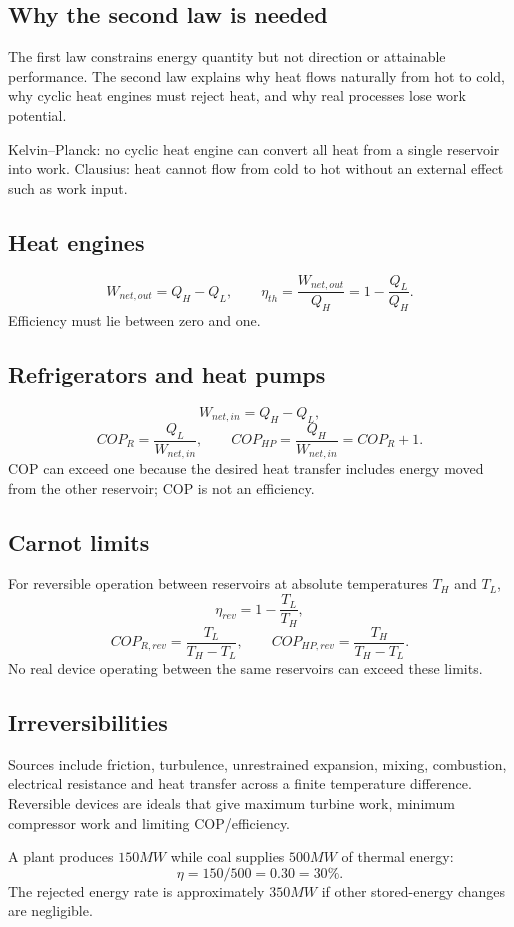 \documentclass[10pt,a4paper]{article}
\begin{document}
\subsection{Why the second law is needed}
The first law constrains energy quantity but not direction or attainable performance. The second law explains why heat flows naturally from hot to cold, why cyclic heat engines must reject heat, and why real processes lose work potential.

Kelvin--Planck: no cyclic heat engine can convert all heat from a single reservoir into work. Clausius: heat cannot flow from cold to hot without an external effect such as work input.

\subsection{Heat engines}
\[
W_{net,out}=Q_H-Q_L,
\qquad \eta_{th}=\frac{W_{net,out}}{Q_H}=1-\frac{Q_L}{Q_H}.
\]
Efficiency must lie between zero and one.

\subsection{Refrigerators and heat pumps}
\[
W_{net,in}=Q_H-Q_L,
\]
\[
COP_R=\frac{Q_L}{W_{net,in}},
\qquad COP_{HP}=\frac{Q_H}{W_{net,in}}=COP_R+1.
\]
COP can exceed one because the desired heat transfer includes energy moved from the other reservoir; COP is not an efficiency.

\subsection{Carnot limits}
For reversible operation between reservoirs at absolute temperatures $T_H$ and $T_L$,
\[
\eta_{rev}=1-\frac{T_L}{T_H},
\]
\[
COP_{R,rev}=\frac{T_L}{T_H-T_L},
\qquad COP_{HP,rev}=\frac{T_H}{T_H-T_L}.
\]
No real device operating between the same reservoirs can exceed these limits.

\subsection{Irreversibilities}
Sources include friction, turbulence, unrestrained expansion, mixing, combustion, electrical resistance and heat transfer across a finite temperature difference. Reversible devices are ideals that give maximum turbine work, minimum compressor work and limiting COP/efficiency.

\begin{example}
A plant produces $150\unit{MW}$ while coal supplies $500\unit{MW}$ of thermal energy:
\[
\eta=150/500=0.30=30\%.
\]
The rejected energy rate is approximately $350\unit{MW}$ if other stored-energy changes are negligible.
\end{example}
\end{document}
